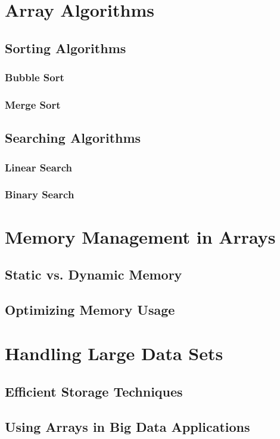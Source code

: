 \documentclass[12pt, oneside]{book}
\begin{document}
	\section{Array Algorithms}
	\subsection{Sorting Algorithms}
	\subsubsection{Bubble Sort}
	\subsubsection{Merge Sort}
	\subsection{Searching Algorithms}
	\subsubsection{Linear Search}
	\subsubsection{Binary Search}
	
	\section{Memory Management in Arrays}
	\subsection{Static vs. Dynamic Memory}
	\subsection{Optimizing Memory Usage}
	
	\section{Handling Large Data Sets}
	\subsection{Efficient Storage Techniques}
	\subsection{Using Arrays in Big Data Applications}
	
\end{document}
